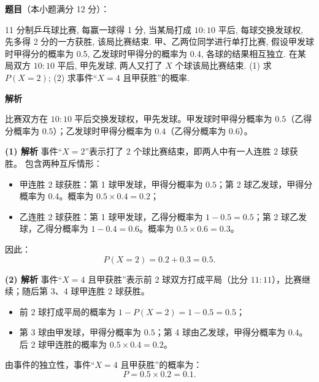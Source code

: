 \begin{answer}

\textbf{题目}（本小题满分 12 分）：

11 分制乒乓球比赛, 每赢一球得 1 分, 当某局打成 $10:10$ 平后, 每球交换发球权, 先多得 2 分的一方获胜, 该局比赛结束. 甲、乙两位同学进行单打比赛, 假设甲发球时甲得分的概率为 0.5, 乙发球时甲得分的概率为 0.4, 各球的结果相互独立. 在某局双方 $10:10$ 平后, 甲先发球, 两人又打了 $X$ 个球该局比赛结束.
(1) 求 $P(X = 2)$;
(2) 求事件“$X = 4$ 且甲获胜”的概率.

\textbf{解析}

比赛双方在 $10:10$ 平后交换发球权，甲先发球。甲发球时甲得分概率为 $0.5$（乙得分概率为 $0.5$）；乙发球时甲得分概率为 $0.4$（乙得分概率为 $0.6$）。

\textbf{(1) 解析}
事件“$X = 2$”表示打了 2 个球比赛结束，即两人中有一人连胜 2 球获胜。
包含两种互斥情形：
\begin{itemize}
\item 甲连胜 2 球获胜：第 1 球甲发球，甲得分概率为 $0.5$；第 2 球乙发球，甲得分概率为 $0.4$。概率为 $0.5 \times 0.4 = 0.2$；
\item 乙连胜 2 球获胜：第 1 球甲发球，乙得分概率为 $1 - 0.5 = 0.5$；第 2 球乙发球，乙得分概率为 $1 - 0.4 = 0.6$。概率为 $0.5 \times 0.6 = 0.3$。
\end{itemize}
因此：
\nopagebreak[4]
\[P(X = 2) = 0.2 + 0.3 = 0.5.\]

\textbf{(2) 解析}
事件“$X = 4$ 且甲获胜”表示前 2 球双方打成平局（比分 $11:11$），比赛继续；随后第 3、4 球甲连胜 2 球获胜。
\begin{itemize}
\item 前 2 球打成平局的概率为 $1 - P(X = 2) = 1 - 0.5 = 0.5$；
\item 第 3 球由甲发球，甲得分概率为 $0.5$；第 4 球由乙发球，甲得分概率为 $0.4$。后 2 球甲连胜的概率为 $0.5 \times 0.4 = 0.2$。
\end{itemize}
由事件的独立性，事件“$X = 4$ 且甲获胜”的概率为：
\nopagebreak[4]
\[P = 0.5 \times 0.2 = 0.1.\]



\end{answer}
